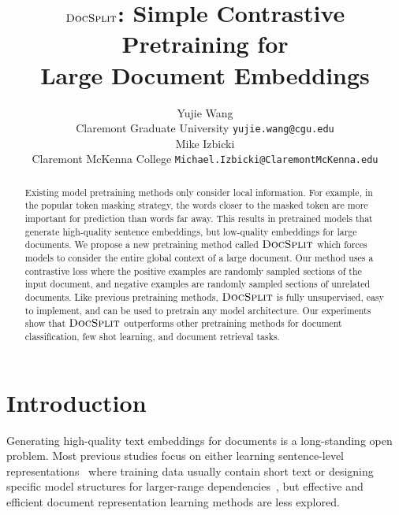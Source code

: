\documentclass[11pt]{article}
\title{$\our$: Simple Contrastive Pretraining for \\ Large Document Embeddings}
\author{Yujie Wang \\
  Claremont Graduate University 
  \texttt{yujie.wang@cgu.edu} \\\And
  Mike Izbicki \\
  Claremont McKenna College
  \texttt{Michael.Izbicki@ClaremontMcKenna.edu} \\}
\newcommand{\our}{\mbox{\textsc{DocSplit}}}
\begin{document}
\maketitle
\begin{abstract}

Existing model pretraining methods only consider local information.
For example, in the popular token masking strategy, the words closer to the masked token are more important for prediction than words far away.
This results in pretrained models that generate high-quality sentence embeddings, but low-quality embeddings for large documents.
We propose a new pretraining method called $\our$ which forces models to consider the entire global context of a large document.
Our method uses a contrastive loss where the positive examples are randomly sampled sections of the input document, and negative examples are randomly sampled sections of unrelated documents.
Like previous pretraining methods, $\our$ is fully unsupervised, easy to implement, and can be used to pretrain any model
architecture.
Our experiments show that $\our$ outperforms other pretraining methods for document classification, few shot learning, and document retrieval tasks.
\end{abstract}



\section{Introduction}


Generating high-quality text embeddings for documents is a long-standing open problem.
Most previous studies focus on either learning sentence-level representations~\cite{Hill2016LearningDR, Logeswaran2018AnEF, Gao2021SimCSESC} where training data usually contain short text or designing specific model structures for larger-range dependencies~\cite{Beltagy2020LongformerTL, Zaheer2020BigBT},
but effective and efficient document representation learning methods are less explored.
\end{document}
